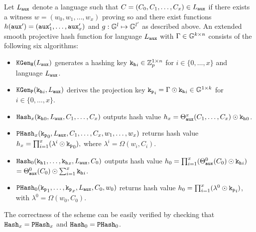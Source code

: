 \begin{definition}[\SPHFF]\label{def:symgensphf}
Let $L_\mathtt{aux}$ denote a language such that $C=(C_0,C_1,\dots,\allowbreak C_x)\in L_\mathtt{aux}$ if there exists a witness $w=(w_0,w_1,\dots,w_x)$ proving so and there exist functions $h(\mathtt{aux}')=(\mathtt{aux}'_1,\dots,\mathtt{aux}'_x)$ and $g:\mathbb{G}^l\mapsto\mathbb{G}^{l'}$ as described above.
An extended smooth projective hash function for language $L_\mathtt{aux}$ with $\Gamma\in\mathbb{G}^{k\times n}$ consists of the following six algorithms:

\begin{itemize}
	\item $\mathtt{KGen_H}(L_\mathtt{aux})$ generates a hashing key $\mathtt{k_h}_i\in\mathbb{Z}_p^{1\times n}$ for $i\in\{0,\dots,x\}$ and language $L_\mathtt{aux}$.
	
	\item $\mathtt{KGen_P}(\mathtt{k_h}_i,L_\mathtt{aux})$ derives the projection key $\mathtt{k_p}_i=\Gamma \odot \mathtt{k_h}_i\in\mathbb{G}^{1\times k}$ for $i\in\{0,\dots,x\}$.
	
	\item $\mathtt{Hash}_x(\mathtt{k_h}_0,L_\mathtt{aux},C_1,\dots,C_x)$ outputs hash value
	$h_x=\Theta^x_{\mathtt{aux}}(C_1,\dots,C_x)\odot\mathtt{k_h}_0$. 
	
	\item $\mathtt{PHash}_x(\mathtt{k_p}_0,L_\mathtt{aux},C_1,\dots,C_x,w_1,\dots,w_x)$ returns hash value
	$h_x=\prod^{x}_{i=1}(\lambda^i\odot \mathtt{k_p}_0),$ where $\lambda^i=\Omega(w_i,C_i)$.
	
	\item $\mathtt{Hash}_0(\mathtt{k_h}_1,\dots,\mathtt{k_h}_x,L_\mathtt{aux},C_0)$ outputs hash value
	$h_0=\prod^{x}_{i=1}(\Theta_{\mathtt{aux}}^0(C_0)\odot\mathtt{k_h}_i)$ $=\Theta_{\mathtt{aux}}^0(C_0)\odot \sum^x_{i=1}\mathtt{k_h}_i$.
	
	\item $\mathtt{PHash}_0(\mathtt{k_p}_1,\dots,\mathtt{k_p}_x,L_\mathtt{aux},C_0,w_0)$ returns hash value
	$h_0=\prod^{x}_{i=1}(\lambda^0\odot \mathtt{k_p}_i)$, with $\lambda^0=\Omega(w_0,C_0)$.
\end{itemize}
\end{definition}

\noindent
The correctness of the scheme can be easily verified by checking that $\mathtt{Hash}_x=\mathtt{PHash}_x$ and $\mathtt{Hash}_0=\mathtt{PHash}_0$.

